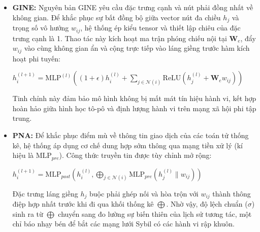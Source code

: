 \begin{itemize}[label={--}, itemsep=5pt]
\begin{itemize}[label={+}, itemsep=4pt]
            \item \textbf{GINE:} Nguyên bản GINE yêu cầu đặc trưng cạnh và nút phải đồng nhất về không gian. Để khắc phục sự bất đồng bộ giữa vector nút đa chiều $h_j$ và trọng số vô hướng $w_{ij}$, hệ thống ép kiểu tensor và thiết lập chiêu của đặc trưng cạnh là 1. Thao tác này kích hoạt ma trận phóng chiếu nội tại $\mathbf{W}_e$, đẩy $w_{ij}$ vào cùng không gian ẩn và cộng trực tiếp vào láng giềng trước hàm kích hoạt phi tuyến:
            \begin{center}
            \(
                h_i^{(l+1)} = \text{MLP}^{(l)} \left( (1 + \epsilon) h_i^{(l)} + \sum_{j \in \mathcal{N}(i)} \text{ReLU} \left( h_j^{(l)} + \mathbf{W}_e w_{ij} \right) \right)
             \)
            \end{center}
            Tinh chỉnh này đảm bảo mô hình không bị mất mát tín hiệu hành vi, kết hợp hoàn hảo giữa hình học tô-pô và định lượng hành vi trên mạng xã hội phi tập trung.

            \item \textbf{PNA:} Để khắc phục điểm mù về thông tin giao dịch của các toán tử thống kê, hệ thống áp dụng cơ chế dung hợp sớm thông qua mạng tiền xử lý (kí hiệu là $\text{MLP}_{pre}$). Công thức truyền tin được tùy chỉnh mở rộng:
            \begin{center}
            \(
                h_i^{(l+1)} = \text{MLP}_{post} \left( h_i^{(l)}, \bigoplus_{j \in \mathcal{N}(i)} \text{MLP}_{pre} \left( h_j^{(l)} \parallel w_{ij} \right) \right)
             \)
            \end{center}
            Đặc trưng láng giềng $h_j$ buộc phải ghép nối và hòa trộn với $w_{ij}$ thành thông điệp hợp nhất trước khi đi qua khối thống kê $\bigoplus$. Nhờ vậy, độ lệch chuẩn ($\sigma$) sinh ra từ $\bigoplus$ chuyển sang đo lường sự biến thiên của lịch sử tương tác, một chỉ báo nhạy bén để bắt các mạng lưới Sybil có các hành vi rập khuôn.


\end{itemize}
\end{itemize}
